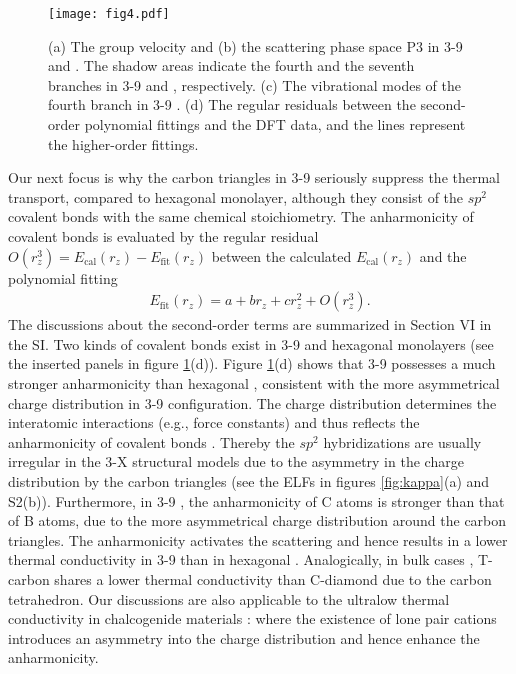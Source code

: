 \documentclass[journal=jpclcd,manuscript=article, layout=twocolumn]{achemso}
\begin{document}
    \begin{figure}[t]
    	\centering
    	\texttt{[image: fig4.pdf]}
    	\caption{(a) The group velocity and (b) the scattering phase space P3 in 3-9  and . The shadow areas indicate the fourth and the seventh branches in 3-9  and , respectively. (c) The vibrational modes of the fourth branch in 3-9 . (d) The regular residuals between the second-order polynomial fittings and the DFT data, and the lines represent the higher-order fittings.}
    	\label{fig:scattering}
    \end{figure}
 	
	Our next focus is why the carbon triangles in 3-9  seriously suppress the thermal transport, compared to hexagonal  monolayer, although they consist of the $sp^2$ covalent bonds with the same chemical stoichiometry. 
	The anharmonicity of covalent bonds is evaluated by the regular residual $O(r_z^3) = E_{\text{cal}}(r_z) - E_{\text{fit}}(r_z)$ between the calculated $E_{\text{cal}}(r_z)$ and the polynomial fitting \cite{2017-PRB-anharmonicity}
	\begin{align}
		E_{\text{fit}}(r_z) = a+br_z+cr_z^2 + O(r_z^3).
	\end{align} 
	 The discussions about the second-order terms are summarized in Section VI in the SI. Two kinds of covalent bonds exist in 3-9 and hexagonal  monolayers (see the inserted panels in figure \ref{fig:scattering}(d)). Figure \ref{fig:scattering}(d) shows that 3-9  possesses a much stronger anharmonicity than hexagonal , consistent with the more asymmetrical charge distribution in 3-9 configuration. The charge distribution determines the interatomic interactions (e.g., force constants) and thus reflects the anharmonicity of covalent bonds \cite{2017-PRB-v}. Thereby the $sp^2$ hybridizations are usually irregular in the 3-X structural models due to the asymmetry in the charge distribution by the carbon triangles (see the ELFs in figures \ref{fig:kappa}(a) and S2(b)). Furthermore, in 3-9 , the anharmonicity of C atoms is stronger than that of B atoms, due to the more asymmetrical charge distribution around the carbon triangles. The anharmonicity activates the scattering and hence results in a lower thermal conductivity in 3-9 than in hexagonal . Analogically, in bulk cases \cite{2017-PRB-T-kappa}, T-carbon shares a lower thermal conductivity than C-diamond due to the carbon tetrahedron. Our discussions are also applicable to the ultralow thermal conductivity in chalcogenide materials \cite{ultralow-LP-jpcl-2020}: where the existence of lone pair cations introduces an asymmetry into the charge distribution and hence enhance the anharmonicity.    
		
\end{document}
